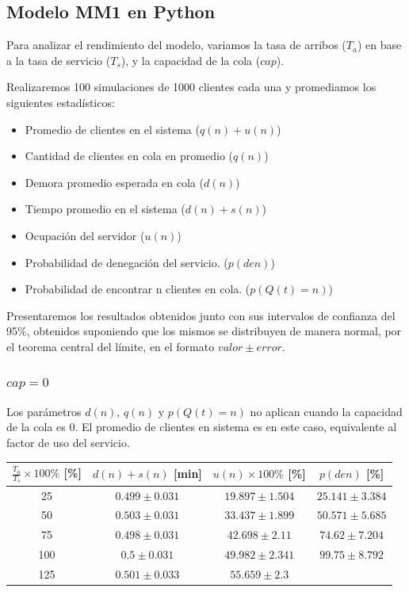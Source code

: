 \subsection{Modelo MM1 en Python}

Para analizar el rendimiento del modelo, variamos la tasa de arribos ($T_a$) en base a la tasa de servicio ($T_s$), y
la capacidad de la cola ($cap$).

Realizaremos 100 simulaciones de 1000 clientes cada una y promediamos los siguientes estadísticos:
\begin{itemize}
    \item Promedio de clientes en el sistema ($q(n)+u(n)$)
    \item Cantidad de clientes en cola en promedio ($q(n)$)
    \item Demora promedio esperada en cola ($d(n)$)
    \item Tiempo promedio en el sistema ($d(n)+s(n)$)
    \item Ocupación del servidor ($u(n)$)
    \item Probabilidad de denegación del servicio. ($p(den)$)
    \item Probabilidad de encontrar n clientes en cola. ($p(Q(t)=n)$)
\end{itemize}

Presentaremos los resultados obtenidos junto con sus intervalos de confianza del 95\%, obtenidos suponiendo que los mismos se distribuyen de manera normal, por el teorema central del límite, en el formato $valor \pm error$.

\subsubsection[cap = 0]{$cap = 0$}

Los parámetros $d(n)$, $q(n)$ y $p(Q(t)=n)$ no aplican cuando la capacidad de la cola es 0. El promedio de clientes en sistema es en este caso, equivalente al factor de uso del servicio.

\begin{tabular}{||c||c|c|c||}
    \hline \hline
    $\frac{T_a}{T_s}\times100\%$ [\%] & $d(n)+s(n)$ [min] & $u(n)\times100\%$ [\%] & $p(den)$ [\%] \\
    \hline \hline
    25 & $0.499 \pm 0.031$ & $19.897 \pm 1.504$ & $25.141 \pm 3.384$ \\
    \hline
    50 & $0.503 \pm 0.031$ & $33.437 \pm 1.899$ & $50.571 \pm 5.685$ \\
    \hline
    75 & $0.498 \pm 0.031$ & $42.698 \pm 2.11$ & $74.62 \pm 7.204$ \\
    \hline
    100 & $0.5 \pm 0.031$ & $49.982 \pm 2.341$ & $99.75 \pm 8.792$ \\
    \hline
    125 & $0.501 \pm 0.033$ & $55.659 \pm 2.3$ & $$ \\
    \hline \hline
\end{tabular}

